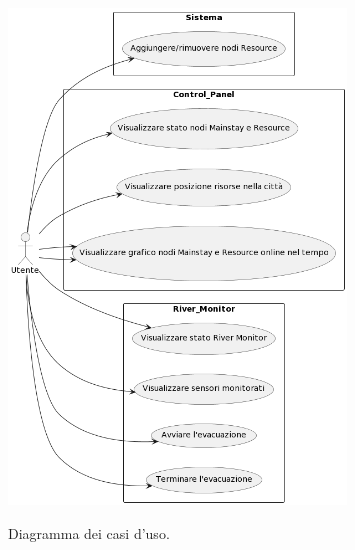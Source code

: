 \documentclass[12pt]{article}
\begin{document}
\begin{figure}[H]
    \centering
    \caption{Diagramma dei casi d'uso.}
    \includegraphics[width=0.8\textwidth]{../assets/images/use-cases-diagram.png}
    \label{fig:use-cases-diagram}
\end{figure}
\end{document}

